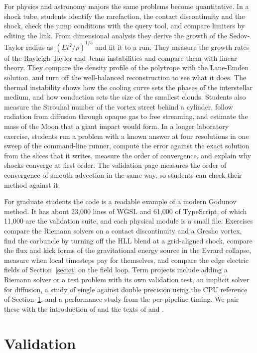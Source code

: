 \documentclass[twocolumn]{aastex701}
\begin{document}
For physics and astronomy majors the same problems become quantitative. In a shock tube, students identify the rarefaction, the contact discontinuity and the shock, check the jump conditions with the query tool, and compare limiters by editing the link. From dimensional analysis they derive the growth of the Sedov-Taylor radius as $(E t^2/\rho)^{1/5}$ and fit it to a run. They measure the growth rates of the Rayleigh-Taylor and Jeans instabilities and compare them with linear theory. They compare the density profile of the polytrope with the Lane-Emden solution, and turn off the well-balanced reconstruction to see what it does. The thermal instability shows how the cooling curve sets the phases of the interstellar medium, and how conduction sets the size of the smallest clouds. Students also measure the Strouhal number of the vortex street behind a cylinder, follow radiation from diffusion through opaque gas to free streaming, and estimate the mass of the Moon that a giant impact would form. In a longer laboratory exercise, students run a problem with a known answer at four resolutions in one sweep of the command-line runner, compute the error against the exact solution from the slices that it writes, measure the order of convergence, and explain why shocks converge at first order. The validation page measures the order of convergence of smooth advection in the same way, so students can check their method against it.

For graduate students the code is a readable example of a modern Godunov method. It has about 23,000 lines of WGSL and 61,000 of TypeScript, of which 11,000 are the validation suite, and each physical module is a small file. Exercises compare the Riemann solvers on a contact discontinuity and a Gresho vortex, find the carbuncle by turning off the HLL blend at a grid-aligned shock, compare the flux and kick forms of the gravitational energy source in the Evrard collapse, measure when local timesteps pay for themselves, and compare the edge electric fields of Section~\ref{sec:ct} on the field loop. Term projects include adding a Riemann solver or a test problem with its own validation test, an implicit solver for diffusion, a study of single against double precision using the CPU reference of Section~\ref{sec:validation}, and a performance study from the per-pipeline timing. We pair these with the introduction of \citet{Trac2003} and the texts of \citet{LeVeque2002} and \citet{Toro2009}.

\section{Validation}
\label{sec:validation}
\end{document}
